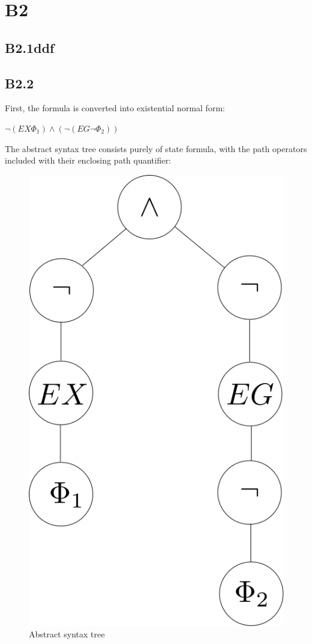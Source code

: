 
\section{B2}
\subsection{B2.1ddf}
\subsection{B2.2}

First, the formula is converted into existential normal form:

$\neg (EX \Phi_1) \wedge (\neg (EG \neg \Phi_2))$

The abstract syntax tree consists purely of state formula,
with the path operators included with their enclosing path quantifier:

\begin{figure}[!htb]
\centering
\includegraphics[scale=.4]{abstract_syntax_tree.png}
\caption{Abstract syntax tree}
\label{fig:ast}
\end{figure}

